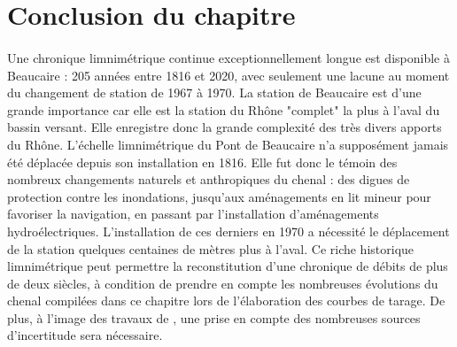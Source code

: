 \documentclass[11pt]{article}
\begin{document}
\FloatBarrier
\section{Conclusion du chapitre}

	\paragraph{} Une chronique limnimétrique continue exceptionnellement longue est disponible à Beaucaire : 205 années entre 1816 et 2020, avec seulement une lacune au moment du changement de station de 1967 à 1970. La station de Beaucaire est d'une grande importance car elle est la station du Rhône "complet" la plus à l'aval du bassin versant. Elle enregistre donc la grande complexité des très divers apports du Rhône. L'échelle limnimétrique du Pont de Beaucaire n'a supposément jamais été déplacée depuis son installation en 1816. Elle fut donc le témoin des nombreux changements naturels et anthropiques du chenal : des digues de protection contre les inondations, jusqu'aux aménagements en lit mineur pour favoriser la navigation, en passant par l'installation d'aménagements hydroélectriques. L'installation de ces derniers en 1970 a nécessité le déplacement de la station quelques centaines de mètres plus à l'aval. Ce riche historique limnimétrique peut permettre la reconstitution d'une chronique de débits de plus de deux siècles, à condition de prendre en compte les nombreuses évolutions du chenal compilées dans ce chapitre lors de l'élaboration des courbes de tarage. De plus, à l'image des travaux de \citet{bard_actualisation_2018}, une prise en compte des nombreuses sources d'incertitude sera nécessaire. 
	
\end{document}
